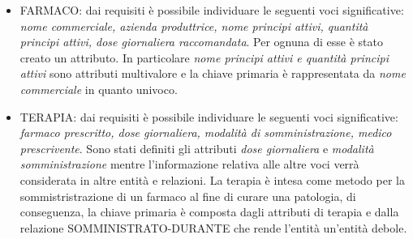\documentclass{article}
\begin{document}
\begin{itemize}
        \item FARMACO: dai requisiti è possibile individuare le seguenti voci
              significative: \textit{nome commerciale, azienda produttrice, 
              nome principi attivi, quantità principi attivi, dose giornaliera
              raccomandata}. Per ognuna di esse è stato creato un attributo. In
              particolare \textit{nome principi attivi e quantità principi 
              attivi} sono attributi multivalore e la chiave primaria è 
              rappresentata da \textit{nome commerciale} in quanto univoco.

        \item TERAPIA: dai requisiti è possibile individuare le seguenti voci
              significative: \textit{farmaco prescritto, dose giornaliera, 
              modalità di somministrazione, medico prescrivente}. Sono stati
              definiti gli attributi \textit{dose giornaliera} e 
              \textit{modalità somministrazione} mentre l'informazione relativa
              alle altre voci verrà considerata in altre entità e relazioni.
              La terapia è intesa come metodo per la sommistristrazione di un
              farmaco al fine di curare una patologia, di conseguenza, la 
              chiave primaria è composta dagli attributi di terapia e dalla
              relazione SOMMINISTRATO-DURANTE che rende l'entità un'entità
              debole.
    \end{itemize}
\end{document}
